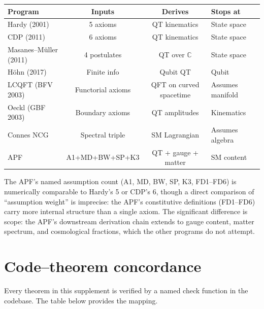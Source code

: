 \documentclass[11pt,a4paper]{article}
\theoremstyle{definition}
\begin{document}
\smallskip
\begin{center}
\small
\begin{tabular}{@{}lccl@{}}
\toprule
\textbf{Program} & \textbf{Inputs} & \textbf{Derives} & \textbf{Stops at} \\
\midrule
Hardy (2001) & 5 axioms & QT kinematics & State space \\
CDP (2011) & 6 axioms & QT kinematics & State space \\
Masanes--M\"uller (2011) & 4 postulates & QT over $\mathbb{C}$ & State space \\
H\"ohn (2017) & Finite info & Qubit QT & Qubit \\
LCQFT (BFV 2003) & Functorial axioms & QFT on curved spacetime & Assumes manifold \\
Oeckl (GBF 2003) & Boundary axioms & QT amplitudes & Kinematics \\
Connes NCG & Spectral triple & SM Lagrangian & Assumes algebra \\
APF & A1+MD+BW+SP+K3 & QT + gauge + matter & SM content \\
\bottomrule
\end{tabular}
\end{center}

\smallskip\noindent The APF's named assumption count (A1, MD, BW, SP,
K3, FD1--FD6) is numerically comparable to Hardy's 5 or CDP's 6,
though a direct comparison of ``assumption weight'' is imprecise: the
APF's constitutive definitions (FD1--FD6) carry more internal structure
than a single axiom.  The significant difference is scope: the APF's
downstream derivation chain extends to gauge content, matter spectrum,
and cosmological fractions, which the other programs do not attempt.


\section{Code--theorem concordance}
\label{app:code}

Every theorem in this supplement is verified by a named check function
in the codebase.  The table below provides the mapping.
\end{document}
